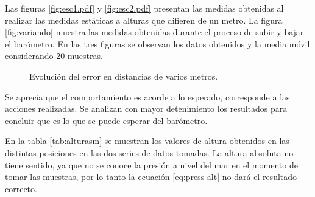\documentclass[main]{subfiles}
\begin{document}
Las figuras \ref{fig:esc1.pdf} y \ref{fig:esc2.pdf} presentan las medidas obtenidas al realizar las medidas estáticas a alturas que difieren de un metro. La figura \ref{fig:variando} muestra las medidas obtenidas durante el proceso de subir y bajar el barómetro. En las tres figuras se observan los datos obtenidos y la media móvil considerando 20 muestras.

\begin{figure}
\hspace{-40pt}
  \caption{Evolución del error en distancias de varios metros.}
\label{fig:autocorr}
\vspace{-15pt}
\end{figure}

Se aprecia que el comportamiento es acorde a lo esperado, corresponde a las acciones realizadas. Se analizan con mayor detenimiento los resultados para concluir que es lo que se puede esperar del barómetro.

En la tabla \ref{tab:alturasm} se muestran los valores de altura obtenidos en las distintas posiciones en las dos series de datos tomadas. La altura absoluta no tiene sentido, ya que no se conoce la presión a nivel del mar en el momento de tomar las muestras, por lo tanto la ecuación \ref{eq:press-alt} no dará el resultado correcto.
\end{document}
